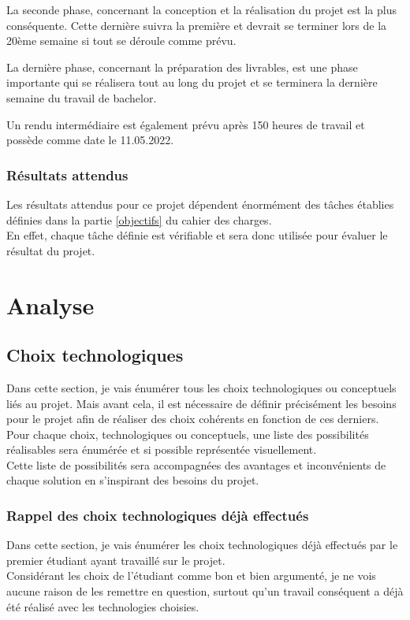 \documentclass[
    iai, %
    il, %
]{heig-tb}
\begin{document}
La seconde phase, concernant la conception et la réalisation du projet est la plus conséquente.
Cette dernière suivra la première et devrait se terminer lors de la 20ème semaine si tout se déroule comme prévu.

La dernière phase, concernant la préparation des livrables, est une phase importante qui se réalisera tout au long du projet et se terminera la dernière semaine du travail de bachelor.

Un rendu intermédiaire est également prévu après 150 heures de travail et possède comme date le 11.05.2022.

\subsection{Résultats attendus}

Les résultats attendus pour ce projet dépendent énormément des tâches établies définies dans la partie \ref{objectifs} du cahier des charges.\\
En effet, chaque tâche définie est vérifiable et sera donc utilisée pour évaluer le résultat du projet.
\newpage


\chapter{Analyse}

\section{Choix technologiques}

Dans cette section, je vais énumérer tous les choix technologiques ou conceptuels liés au projet.
Mais avant cela, il est nécessaire de définir précisément les besoins pour le projet afin de réaliser des choix cohérents en fonction de ces derniers.\\
Pour chaque choix, technologiques ou conceptuels, une liste des possibilités réalisables sera énumérée et si possible représentée visuellement.\\
Cette liste de possibilités sera accompagnées des avantages et inconvénients de chaque solution en s'inspirant des besoins du projet.

\subsection{Rappel des choix technologiques déjà effectués}
Dans cette section, je vais énumérer les choix technologiques déjà effectués par le premier étudiant ayant travaillé sur le projet.\\
Considérant les choix de l'étudiant comme bon et bien argumenté, je ne vois aucune raison de les remettre en question, surtout qu'un travail conséquent a déjà été réalisé avec les technologies choisies.
\end{document}
